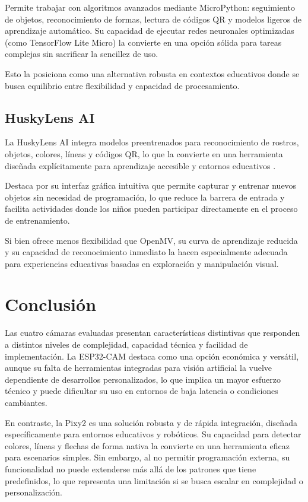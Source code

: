 \documentclass{prgrado}
\begin{document}
Permite trabajar con algoritmos avanzados mediante MicroPython: seguimiento de objetos, reconocimiento de formas, lectura de códigos QR y modelos ligeros de aprendizaje automático. Su capacidad de ejecutar redes neuronales optimizadas (como TensorFlow Lite Micro) la convierte en una opción sólida para tareas complejas sin sacrificar la sencillez de uso.

Esto la posiciona como una alternativa robusta en contextos educativos donde se busca equilibrio entre flexibilidad y capacidad de procesamiento.

\subsection{HuskyLens AI}

La HuskyLens AI integra modelos preentrenados para reconocimiento de rostros, objetos, colores, líneas y códigos QR, lo que la convierte en una herramienta diseñada explícitamente para aprendizaje accesible y entornos educativos \cite{dfrobot2021huskylens}. 

Destaca por su interfaz gráfica intuitiva que permite capturar y entrenar nuevos objetos sin necesidad de programación, lo que reduce la barrera de entrada y facilita actividades donde los niños pueden participar directamente en el proceso de entrenamiento.

Si bien ofrece menos flexibilidad que OpenMV, su curva de aprendizaje reducida y su capacidad de reconocimiento inmediato la hacen especialmente adecuada para experiencias educativas basadas en exploración y manipulación visual.

\section{Conclusión}

Las cuatro cámaras evaluadas presentan características distintivas que responden a distintos niveles de complejidad, capacidad técnica y facilidad de implementación. La ESP32-CAM destaca como una opción económica y versátil, aunque su falta de herramientas integradas para visión artificial la vuelve dependiente de desarrollos personalizados, lo que implica un mayor esfuerzo técnico y puede dificultar su uso en entornos de baja latencia o condiciones cambiantes.

En contraste, la Pixy2 es una solución robusta y de rápida integración, diseñada específicamente para entornos educativos y robóticos. Su capacidad para detectar colores, líneas y flechas de forma nativa la convierte en una herramienta eficaz para escenarios simples. Sin embargo, al no permitir programación externa, su funcionalidad no puede extenderse más allá de los patrones que tiene predefinidos, lo que representa una limitación si se busca escalar en complejidad o personalización.
\end{document}
